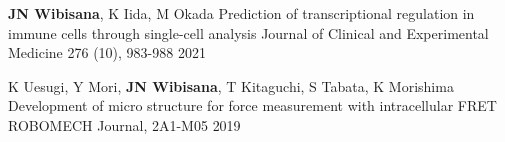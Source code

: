 

\begin{cventries}

  \cvpres
    {\textbf{JN Wibisana}, K Iida, M Okada} %
    {Prediction of transcriptional regulation in immune cells through single-cell analysis} %
    {Journal of Clinical and Experimental Medicine 276 (10), 983-988} %
    {2021} %


\end{cventries}


\begin{cventries}

  \cvpres
    {K Uesugi, Y Mori, \textbf{JN Wibisana}, T Kitaguchi, S Tabata, K Morishima} %
    {Development of micro structure for force measurement with intracellular FRET} %
    {ROBOMECH Journal, 2A1-M05} %
    {2019} %


\end{cventries}
